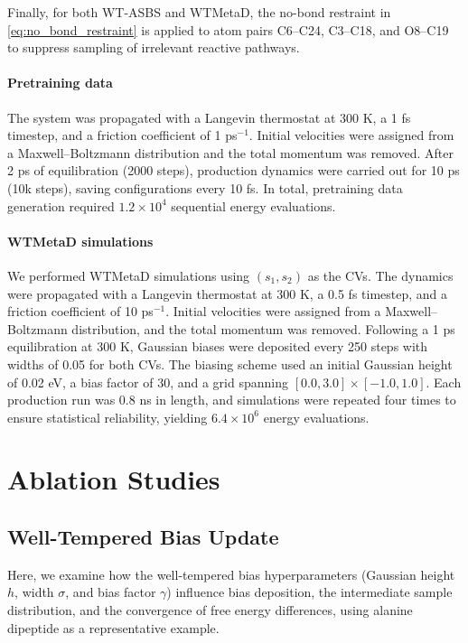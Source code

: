 \documentclass[]{fairmeta}
\theoremstyle{remark}
\begin{document}
Finally, for both WT-ASBS and WTMetaD, the no-bond restraint in \cref{eq:no_bond_restraint} is applied to atom pairs C6--C24, C3--C18, and O8--C19 to suppress sampling of irrelevant reactive pathways.


\paragraph{Pretraining data}
The system was propagated with a Langevin thermostat at 300 K, a 1 fs timestep, and a friction coefficient of 1 ps$^{-1}$.
Initial velocities were assigned from a Maxwell--Boltzmann distribution and the total momentum was removed.
After 2 ps of equilibration (2000 steps), production dynamics were carried out for 10 ps (10k steps), saving configurations every 10 fs.
In total, pretraining data generation required $1.2 \times 10^4$ sequential energy evaluations.

\paragraph{WTMetaD simulations}
We performed WTMetaD simulations using $(s_1, s_2)$ as the CVs.
The dynamics were propagated with a Langevin thermostat at 300 K, a 0.5 fs timestep, and a friction coefficient of 10 ps$^{-1}$.
Initial velocities were assigned from a Maxwell--Boltzmann distribution, and the total momentum was removed.
Following a 1 ps equilibration at 300 K, Gaussian biases were deposited every 250 steps with widths of 0.05 for both CVs.
The biasing scheme used an initial Gaussian height of 0.02 eV, a bias factor of 30, and a grid spanning $[0.0, 3.0] \times [-1.0, 1.0]$.
Each production run was 0.8 ns in length, and simulations were repeated four times to ensure statistical reliability, yielding $6.4 \times 10^6$ energy evaluations.


\section{Ablation Studies}
\label{sec:ablation_studies}

\subsection{Well-Tempered Bias Update}

Here, we examine how the well-tempered bias hyperparameters (Gaussian height $h$, width $\sigma$, and bias factor $\gamma$) influence bias deposition, the intermediate sample distribution, and the convergence of free energy differences, using alanine dipeptide as a representative example.
\end{document}
